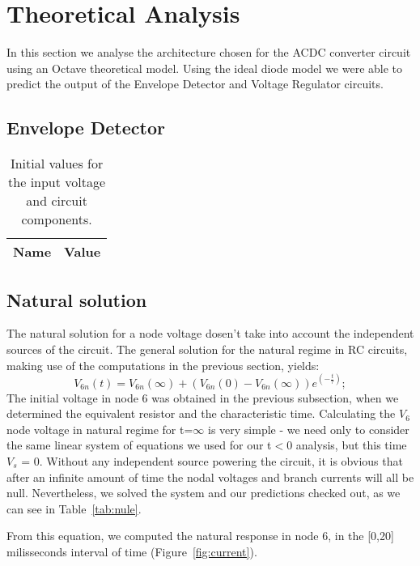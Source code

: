 \section{Theoretical Analysis}
\label{sec:analysis}

In this section we analyse the architecture chosen for the ACDC converter circuit using an Octave theoretical model. Using the ideal diode model we were able to predict the output of the Envelope Detector and Voltage Regulator circuits.

\subsection{Envelope Detector}

\begin{table}[h]
  \centering
  \begin{tabular}{|l|r|}
    \hline    
    {\bf Name} & {\bf Value} \\ \hline
     
  \end{tabular}
  \caption{Initial values for the input voltage and circuit components.}
  \label{tab:equivalent}
\end{table}
\subsection{Natural solution}
The natural solution for a node voltage dosen't take into account the independent sources of the circuit. The general solution for the natural regime in RC circuits, making use of the computations in the previous section, yields:
\begin{equation}
V_{6n}(t)=V_{6n}(\infty) + (V_{6n}(0) - V_{6n}(\infty))e^{(-\frac{t}{\tau})};
\end{equation}
The initial voltage in node 6 was obtained in the previous subsection, when we determined the equivalent resistor and the characteristic time. Calculating the $V_{6}$ node voltage in natural regime for t=$\infty$ is very simple - we need only to consider the same linear system of equations we used for our t$<$0 analysis, but this time $V_{s}$ = 0. Without any independent source powering the circuit, it is obvious that after an infinite amount of time the nodal voltages and branch currents will all be null. Nevertheless, we solved the system and our predictions checked out, as we can see in Table~\ref{tab:nule}.

From this equation, we computed the natural response in node 6, in the [0,20] milisseconds interval of time (Figure~\ref{fig:current}).

